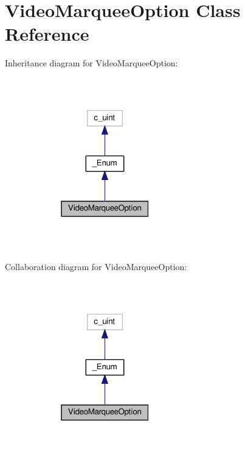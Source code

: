 \hypertarget{classvlc_1_1_video_marquee_option}{}\section{Video\+Marquee\+Option Class Reference}
\label{classvlc_1_1_video_marquee_option}


Inheritance diagram for Video\+Marquee\+Option\+:
\nopagebreak
\begin{figure}[H]
\begin{center}
\leavevmode
\includegraphics[width=187pt]{classvlc_1_1_video_marquee_option__inherit__graph}
\end{center}
\end{figure}


Collaboration diagram for Video\+Marquee\+Option\+:
\nopagebreak
\begin{figure}[H]
\begin{center}
\leavevmode
\includegraphics[width=187pt]{classvlc_1_1_video_marquee_option__coll__graph}
\end{center}
\end{figure}
